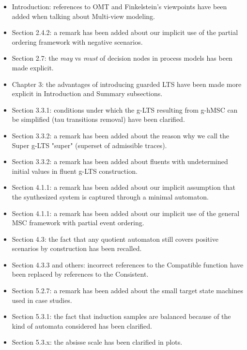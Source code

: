 \begin{itemize}
\item Introduction: references to OMT and Finkelstein's viewpoints have been added 
  when talking about Multi-view modeling.
\item Section 2.4.2: a remark has been added about our implicit use of the partial 
  ordering framework with negative scenarios.
\item Section 2.7: the \emph{may} vs \emph{must} of decision nodes in process models has been 
  made explicit.
\item Chapter 3: the advantages of introducing guarded LTS have been made more 
  explicit in Introduction and Summary subsections.
\item Section 3.3.1: conditions under which the g-LTS resulting from g-hMSC can be
  simplified (tau transitions removal) have been clarified.
\item Section 3.3.2: a remark has been added about the reason why we call the Super 
  g-LTS "super" (superset of admissible traces).
\item Section 3.3.2: a remark has been added about fluents with undetermined initial
  values in fluent g-LTS construction.
\item Section 4.1.1: a remark has been added about our implicit assumption that the
  synthesized system is captured through a minimal automaton.
\item Section 4.1.1: a remark has been added about our implicit use of the general 
  MSC framework with partial event ordering.
\item Section 4.3: the fact that any quotient automaton still covers positive 
  scenarios by construction has been recalled.
\item Section 4.3.3 and others: incorrect references to the Compatible function have
  been replaced by references to the Consistent.
\item Section 5.2.7: a remark has been added about the small target state machines 
  used in case studies.
\item Section 5.3.1: the fact that induction samples are balanced because of the 
  kind of automata considered has been clarified.
\item Section 5.3.x: the absisse scale has been clarified in plots.
\end{itemize}

